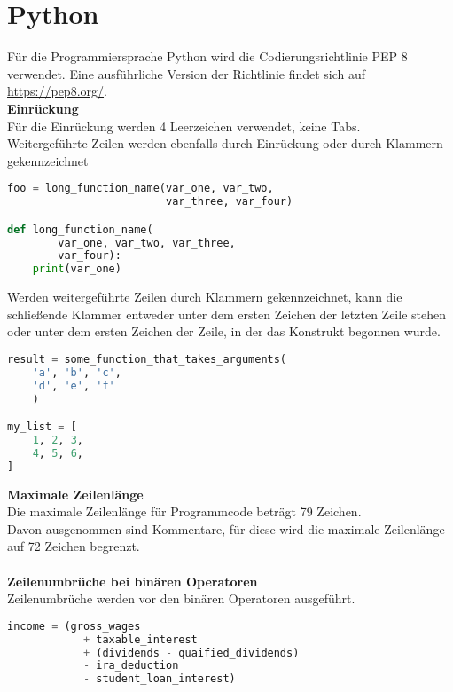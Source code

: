 \section{Python}
Für die Programmiersprache Python wird die Codierungsrichtlinie PEP 8 verwendet. Eine ausführliche Version der Richtlinie findet sich auf \url{https://pep8.org/}. \\
\textbf{Einrückung}\\
Für die Einrückung werden 4 Leerzeichen verwendet, keine Tabs.\\
Weitergeführte Zeilen werden ebenfalls durch Einrückung oder durch Klammern gekennzeichnet \\
\begin{lstlisting}[language = Python, caption = Weitergeführte Zeilen gekennzeichnet durch Einrückungen, label = lst:Einrückungen]
foo = long_function_name(var_one, var_two,
						 var_three, var_four)

def long_function_name(
		var_one, var_two, var_three,
		var_four):
	print(var_one)
\end{lstlisting}

Werden weitergeführte Zeilen durch Klammern gekennzeichnet, kann die schließende Klammer entweder unter dem ersten Zeichen der letzten Zeile stehen oder unter dem ersten Zeichen der Zeile, in der das Konstrukt begonnen wurde.\\
\begin{lstlisting}[language = Python, caption = Weitergeführte Zeilen gekennzeichnet durch Klammern, label = lst:klammern]
result = some_function_that_takes_arguments(
	'a', 'b', 'c',
	'd', 'e', 'f'
	)

my_list = [
	1, 2, 3,
	4, 5, 6,
]
\end{lstlisting}

\textbf{Maximale Zeilenlänge}\\
Die maximale Zeilenlänge für Programmcode beträgt 79 Zeichen. \\
Davon ausgenommen sind Kommentare, für diese wird die maximale Zeilenlänge auf 72 Zeichen begrenzt.\\ \\

\textbf{Zeilenumbrüche bei binären Operatoren}\\
Zeilenumbrüche werden vor den binären Operatoren ausgeführt.
\begin{lstlisting}[language = Python, caption = Zeilenumbrüche bei binären Operatoren, label = lst:zeilenumbruch]
income = (gross_wages
			+ taxable_interest
			+ (dividends - quaified_dividends)
			- ira_deduction
			- student_loan_interest)
\end{lstlisting}

